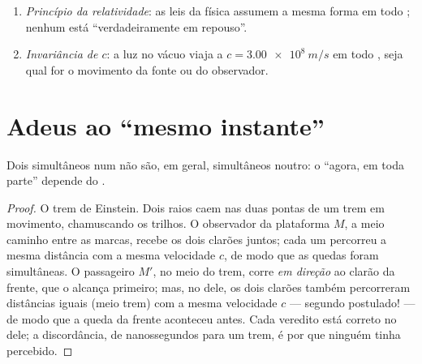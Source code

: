 \begin{theorem}\label{thm:g12:special-relativity:postulates}
\begin{enumerate}
  \item \emph{Princípio da relatividade}: as leis da física assumem a mesma forma em
        todo ; nenhum está ``verdadeiramente em repouso''.
  \item \emph{Invariância de $c$}: a luz no vácuo viaja a $c = \qty{3.00e8}{m/s}$ em
        todo , seja qual for o movimento da fonte ou do observador.
\end{enumerate}
\end{theorem}
\admitted

\section{Adeus ao ``mesmo instante''}

\begin{proposition}\label{prop:g12:special-relativity:simultaneity}
Dois  simultâneos num  não são, em geral, simultâneos noutro:
o ``agora, em toda parte'' depende do .
\end{proposition}

\begin{proof}
O trem de Einstein. Dois raios caem nas duas pontas de um trem em movimento, chamuscando
os trilhos. O observador da plataforma $M$, a meio caminho entre as marcas, recebe os
dois clarões juntos; cada um percorreu a mesma distância com a mesma velocidade $c$, de
modo que as quedas foram simultâneas. O passageiro $M'$, no meio do trem, corre
\emph{em direção} ao clarão da frente, que o alcança primeiro; mas, no  dele,
os dois clarões também percorreram distâncias iguais (meio trem) com a mesma velocidade
$c$ --- segundo postulado! --- de modo que a queda da frente aconteceu antes. Cada
veredito está correto no  dele; a discordância, de nanossegundos para um trem,
é por que ninguém tinha percebido.
\end{proof}

